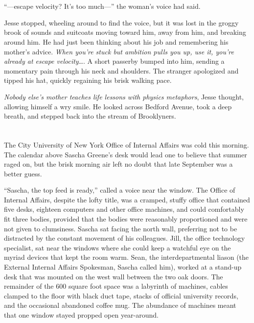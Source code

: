 \documentclass[12pt]{book}
\begin{document}
\chapter{}

``---escape velocity?  It's too much---'' the woman's voice had said.

Jesse stopped, wheeling around to find the voice, but it was lost in the groggy brook of sounds and suitcoats moving toward him, away from him, and breaking around him.  He had just been thinking about his job and remembering his mother's advice.  \emph{When you're stuck but ambition pulls you up, use it, you're already at escape velocity}\dots.  A short passerby bumped into him, sending a momentary pain through his neck and shoulders.  The stranger apologized and tipped his hat, quickly regaining his brisk walking pace.

\emph{Nobody else's mother teaches life lessons with physics metaphors}, Jesse thought, allowing himself a wry smile.  He looked across Bedford Avenue, took a deep breath, and stepped back into the stream of Brooklyners.

\chapter{}

The City University of New York Office of Internal Affairs was cold this morning.  The calendar above Sascha Greene's desk would lead one to believe that summer raged on, but the brisk morning air left no doubt that late September was a better guess.

``Sascha, the top feed is ready,'' called a voice near the window.  The Office of Internal Affairs, despite the lofty title, was a cramped, stuffy office that contained five desks, eighteen computers and other office machines, and could comfortably fit three bodies, provided that the bodies were reasonably proportioned and were not given to clumsiness.  Sascha sat facing the north wall, preferring not to be distracted by the constant movement of his colleagues.  Jill, the office technology specialist, sat near the windows where she could keep a watchful eye on the myriad devices that kept the room warm.  Sean, the interdepartmental liason (the External Internal Affairs Spokesman, Sascha called him), worked at a stand-up desk that was mounted on the west wall between the two oak doors.  The remainder of the 600 square foot space was a labyrinth of machines, cables clamped to the floor with black duct tape, stacks of official university records, and the occasional abandoned coffee mug.  The abundance of machines meant that one window stayed propped open year-around.
\end{document}
